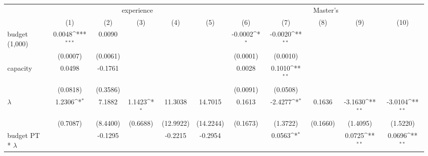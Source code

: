 {
\def\sym#1{\ifmmode^{#1}\else\(^{#1}\)\fi}
\begin{tabular}{l*{10}{c}}
\hline\hline
                    &\multicolumn{5}{c}{experience}                                                                               &\multicolumn{5}{c}{Master's}                                                                                 \\\cmidrule(lr){2-6}\cmidrule(lr){7-11}
                    &\multicolumn{1}{c}{(1)}         &\multicolumn{1}{c}{(2)}         &\multicolumn{1}{c}{(3)}         &\multicolumn{1}{c}{(4)}         &\multicolumn{1}{c}{(5)}         &\multicolumn{1}{c}{(6)}         &\multicolumn{1}{c}{(7)}         &\multicolumn{1}{c}{(8)}         &\multicolumn{1}{c}{(9)}         &\multicolumn{1}{c}{(10)}         \\
\hline
budget (1,000)      &      0.0048\sym{***}&      0.0090         &                     &                     &                     &     -0.0002\sym{*}  &     -0.0020\sym{**} &                     &                     &                     \\
                    &    (0.0007)         &    (0.0061)         &                     &                     &                     &    (0.0001)         &    (0.0010)         &                     &                     &                     \\
[1em]
capacity            &      0.0498         &     -0.1761         &                     &                     &                     &      0.0028         &      0.1010\sym{**} &                     &                     &                     \\
                    &    (0.0818)         &    (0.3586)         &                     &                     &                     &    (0.0091)         &    (0.0508)         &                     &                     &                     \\
[1em]
$\lambda$           &      1.2306\sym{*}  &      7.1882         &      1.1423\sym{*}  &     11.3038         &     14.7015         &      0.1613         &     -2.4277\sym{*}  &      0.1636         &     -3.1630\sym{**} &     -3.0104\sym{**} \\
                    &    (0.7087)         &    (8.4400)         &    (0.6688)         &   (12.9922)         &   (14.2244)         &    (0.1673)         &    (1.3722)         &    (0.1660)         &    (1.4095)         &    (1.5220)         \\
[1em]
budget PT * $\lambda$&                     &     -0.1295         &                     &     -0.2215         &     -0.2954         &                     &      0.0563\sym{*}  &                     &      0.0725\sym{**} &      0.0696\sym{**} \\

\end{tabular}}

